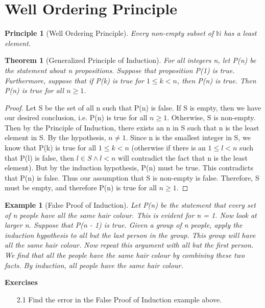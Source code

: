 \documentclass[11pt, oneside]{book}
\theoremstyle{break}
\newtheorem{thm}{Theorem}[section]
\newtheorem*{proof}{Proof}
\newtheorem{eg}{Example}[section]
\newtheorem{principle}{Principle}[chapter]
\newcommand{\bb}[1]{\mathbb{#1}}			%
\begin{document}
\section{Well Ordering Principle}

\begin{principle}[Well Ordering Principle]
	Every non-empty subset of $\bb{N}$ has a least element.
\end{principle}

\begin{thm}[Generalized Principle of Induction]
	For all integers n, let P(n) be the statement about n propositions. Suppose that proposition P(1) is true. Furthermore, suppose that if P(k) is true for $1 \leq k < n$, then P(n) is true. Then P(n) is true for all $n \geq 1$.
\end{thm}

\begin{proof}
	Let S be the set of all n such that P(n) is false. If S is empty, then we have our desired conclusion, i.e. P(n) is true for all $n \geq 1$. Otherwise, S is non-empty. Then by the Principle of Induction, there exists an n in S such that n is the least element in S. By the hypothesis, $n \neq 1$. Since n is the smallest integer in S, we know that P(k) is true for all $1 \leq k < n$ (otherwise if there is an $1 \leq l < n$ such that P(l) is false, then $l \in S \land l < n$ will contradict the fact that n is the least element). But by the induction hypothesis, P(n) must be true. This contradicts that P(n) is false. Thus our assumption that S is non-empty is false. Therefore, S must be empty, and therefore P(n) is true for all $n \geq 1$.
\end{proof}

\begin{eg}[False Proof of Induction]
	Let P(n) be the statement that every set of n people have all the same hair colour. This is evident for n = 1. Now look at larger n. Suppose that P(n - 1) is true. Given a group of n people, apply the induction hypothesis to all but the last person in the group. This group will have all the same hair colour. Now repeat this argument with all but the first person. We find that all the people have the same hair colour by combining these two facts. By induction, all people have the same hair colour.
\end{eg}

\textbf{Exercises}
\begin{enumerate}
	\item[2.1] Find the error in the False Proof of Induction example above.
\end{enumerate}
\end{document}
